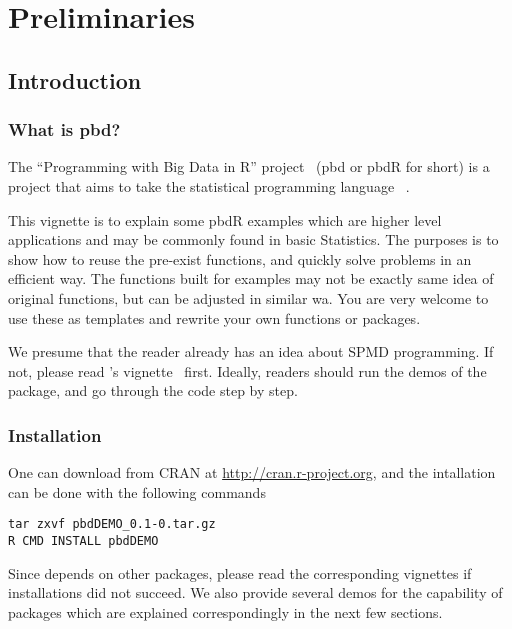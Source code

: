 \part{Preliminaries}








\chapter[Introduction]{Introduction}
\label{sec:introduction}


\section{What is pbd?}

The ``Programming with Big Data in R'' project~\citep{pbdR2012} (pbd or pbdR for short) is a project that aims to take the statistical programming language ~\citep{Rcore}.












This vignette is to explain some pbdR examples which are higher level
applications and may be commonly found in basic Statistics.
The purposes is to show how to reuse the pre-exist functions, and
quickly solve problems in an efficient way.
The functions built for examples may not be exactly same idea of original
functions, but can be adjusted in similar wa.
You are very welcome to use these as templates and rewrite your own functions
or packages.

We presume that the reader already has an idea about SPMD programming. If not,
please read 's vignette~\citep{Chen2012pbdMPIvignette} first.
Ideally, readers should run the demos of the  package,
and go through the code step by step.




\section[Installation]{Installation}
\label{sec:installation}

One can download  from CRAN at
\url{http://cran.r-project.org}, and
the intallation can be done with the following commands
\begin{lstlisting}
tar zxvf pbdDEMO_0.1-0.tar.gz
R CMD INSTALL pbdDEMO
\end{lstlisting}
Since  depends on other  packages,
please read the corresponding vignettes if installations did
not succeed.
We also provide several demos for the capability of 
packages which are explained correspondingly in the next few sections.


